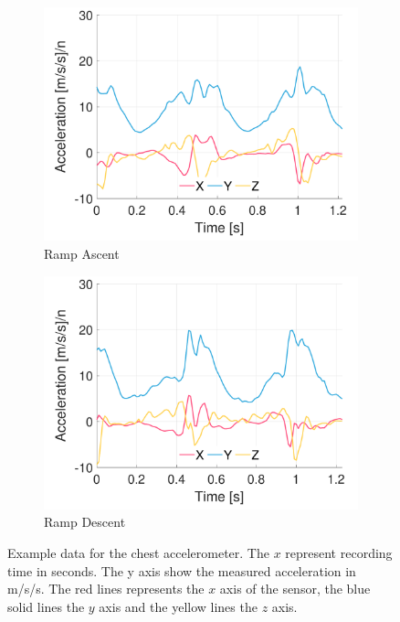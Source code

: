 \begin{figure}[p]
    \begin{subfigure}[b]{0.49\textwidth}
         \centering
         \includegraphics[width=\textwidth]{content/3-Methods/example-data/ch3_example_data_subject_01_chest_accel_activity_ramp_up.pdf}
         \caption{Ramp Ascent}
    \end{subfigure}
    \begin{subfigure}[b]{0.49\textwidth}
         \centering
         \includegraphics[width=\textwidth]{content/3-Methods/example-data/ch3_example_data_subject_01_chest_accel_activity_ramp_down.pdf}
         \caption{Ramp Descent}
    \end{subfigure}
    \caption[Example chest accelerometer data]{Example data for the chest accelerometer. The $x$ represent recording time in seconds. The y axis show the measured acceleration in m/s/s. The red lines represents the $x$ axis of the sensor, the blue solid lines the $y$ axis and the yellow lines the $z$ axis.}
    \label{fig:example-chest-accel-sensor-data}
\end{figure}


